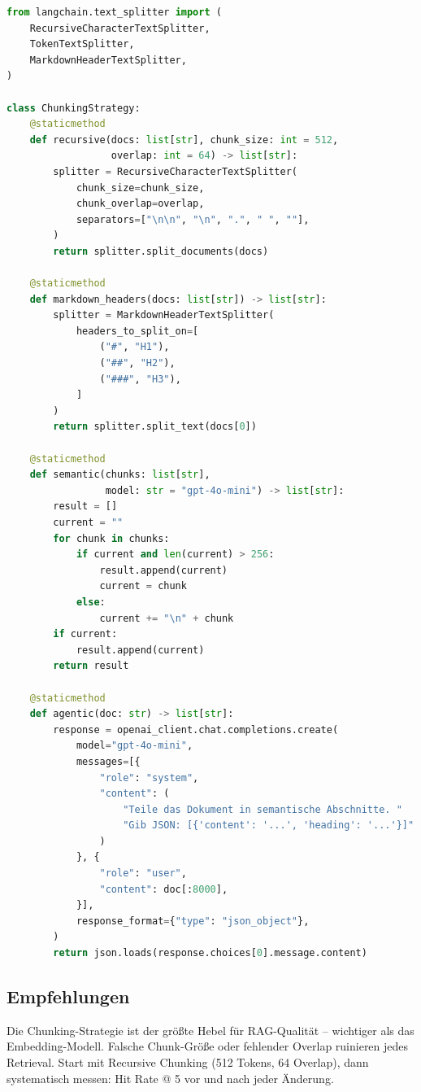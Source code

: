 \begin{lstlisting}[language=Python, caption=Verschiedene Chunking-Strategien]
from langchain.text_splitter import (
    RecursiveCharacterTextSplitter,
    TokenTextSplitter,
    MarkdownHeaderTextSplitter,
)

class ChunkingStrategy:
    @staticmethod
    def recursive(docs: list[str], chunk_size: int = 512,
                  overlap: int = 64) -> list[str]:
        splitter = RecursiveCharacterTextSplitter(
            chunk_size=chunk_size,
            chunk_overlap=overlap,
            separators=["\n\n", "\n", ".", " ", ""],
        )
        return splitter.split_documents(docs)

    @staticmethod
    def markdown_headers(docs: list[str]) -> list[str]:
        splitter = MarkdownHeaderTextSplitter(
            headers_to_split_on=[
                ("#", "H1"),
                ("##", "H2"),
                ("###", "H3"),
            ]
        )
        return splitter.split_text(docs[0])

    @staticmethod
    def semantic(chunks: list[str],
                 model: str = "gpt-4o-mini") -> list[str]:
        result = []
        current = ""
        for chunk in chunks:
            if current and len(current) > 256:
                result.append(current)
                current = chunk
            else:
                current += "\n" + chunk
        if current:
            result.append(current)
        return result

    @staticmethod
    def agentic(doc: str) -> list[str]:
        response = openai_client.chat.completions.create(
            model="gpt-4o-mini",
            messages=[{
                "role": "system",
                "content": (
                    "Teile das Dokument in semantische Abschnitte. "
                    "Gib JSON: [{'content': '...', 'heading': '...'}]"
                )
            }, {
                "role": "user",
                "content": doc[:8000],
            }],
            response_format={"type": "json_object"},
        )
        return json.loads(response.choices[0].message.content)
\end{lstlisting}

\subsection{Empfehlungen}

\begin{praxishinweis}
Die Chunking-Strategie ist der größte Hebel für RAG-Qualität -- wichtiger als das Embedding-Modell. Falsche Chunk-Größe oder fehlender Overlap ruinieren jedes Retrieval. Start mit Recursive Chunking (512 Tokens, 64 Overlap), dann systematisch messen: Hit Rate @ 5 vor und nach jeder Änderung.
\end{praxishinweis}

